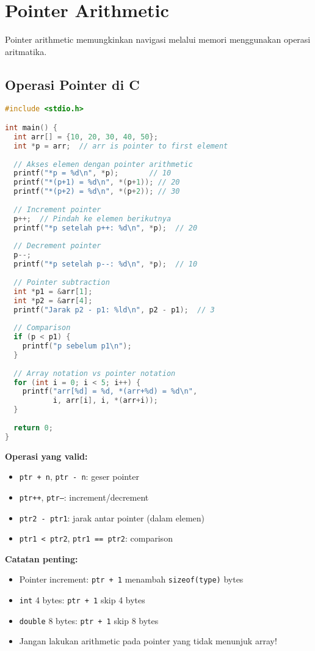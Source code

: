 \documentclass[../main.tex]{subfiles}
\begin{document}
\section{Pointer Arithmetic}

Pointer arithmetic memungkinkan navigasi melalui memori menggunakan operasi aritmatika.

\subsection{Operasi Pointer di C}

\begin{lstlisting}[language=C, caption={Pointer arithmetic di C}]
#include <stdio.h>

int main() {
  int arr[] = {10, 20, 30, 40, 50};
  int *p = arr;  // arr is pointer to first element
  
  // Akses elemen dengan pointer arithmetic
  printf("*p = %d\n", *p);       // 10
  printf("*(p+1) = %d\n", *(p+1)); // 20
  printf("*(p+2) = %d\n", *(p+2)); // 30
  
  // Increment pointer
  p++;  // Pindah ke elemen berikutnya
  printf("*p setelah p++: %d\n", *p);  // 20
  
  // Decrement pointer
  p--;
  printf("*p setelah p--: %d\n", *p);  // 10
  
  // Pointer subtraction
  int *p1 = &arr[1];
  int *p2 = &arr[4];
  printf("Jarak p2 - p1: %ld\n", p2 - p1);  // 3
  
  // Comparison
  if (p < p1) {
    printf("p sebelum p1\n");
  }
  
  // Array notation vs pointer notation
  for (int i = 0; i < 5; i++) {
    printf("arr[%d] = %d, *(arr+%d) = %d\n", 
           i, arr[i], i, *(arr+i));
  }
  
  return 0;
}
\end{lstlisting}

\textbf{Operasi yang valid:}
\begin{itemize}
  \item \texttt{ptr + n}, \texttt{ptr - n}: geser pointer
  \item \texttt{ptr++}, \texttt{ptr--}: increment/decrement
  \item \texttt{ptr2 - ptr1}: jarak antar pointer (dalam elemen)
  \item \texttt{ptr1 < ptr2}, \texttt{ptr1 == ptr2}: comparison
\end{itemize}

\textbf{Catatan penting:}
\begin{itemize}
  \item Pointer increment: \texttt{ptr + 1} menambah \texttt{sizeof(type)} bytes
  \item \texttt{int} 4 bytes: \texttt{ptr + 1} skip 4 bytes
  \item \texttt{double} 8 bytes: \texttt{ptr + 1} skip 8 bytes
  \item Jangan lakukan arithmetic pada pointer yang tidak menunjuk array!
\end{itemize}
\end{document}
